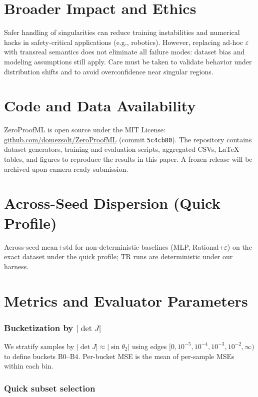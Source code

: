 \documentclass[11pt,twoside]{article}
\begin{document}
\section{Broader Impact and Ethics}
Safer handling of singularities can reduce training instabilities and numerical hacks in safety-critical applications (e.g., robotics). However, replacing ad-hoc $\varepsilon$ with transreal semantics does not eliminate all failure modes: dataset bias and modeling assumptions still apply. Care must be taken to validate behavior under distribution shifts and to avoid overconfidence near singular regions.

\section*{Code and Data Availability}
ZeroProofML is open source under the MIT License: \href{https://github.com/domezsolt/ZeroProofML}{github.com/domezsolt/ZeroProofML} (commit \texttt{5c4cb80}). The repository contains dataset generators, training and evaluation scripts, aggregated CSVs, LaTeX tables, and figures to reproduce the results in this paper. A frozen release will be archived upon camera-ready submission.

\appendix
\section{Across-Seed Dispersion (Quick Profile)}
Across-seed mean$\pm$std for non-deterministic baselines (MLP, Rational+$\varepsilon$) on the exact dataset under the quick profile; TR runs are deterministic under our harness.


\section{Metrics and Evaluator Parameters}

\subsubsection{Bucketization by $|\det J|$}

We stratify samples by $|\det J|\approx|\sin\theta_2|$ using edges $[0,10^{-5},10^{-4},10^{-3},10^{-2},\infty)$ to define buckets B0--B4. Per-bucket MSE is the mean of per-sample MSEs within each bin.

\subsubsection{Quick subset selection}
\end{document}
